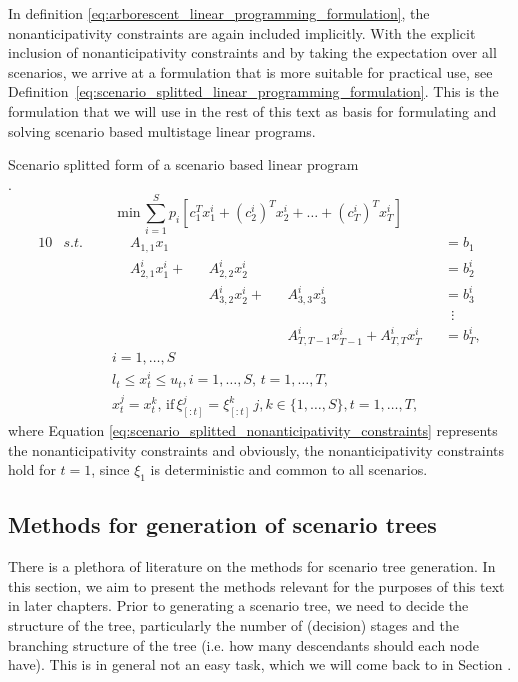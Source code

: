 In definition \ref{eq:arborescent_linear_programming_formulation}, the nonanticipativity constraints are again included implicitly. With the explicit inclusion of nonanticipativity constraints and by taking the expectation over all scenarios, we arrive at a formulation that is more suitable for practical use, see Definition~\ref{eq:scenario_splitted_linear_programming_formulation}. This is the formulation that we will use in the rest of this text as basis for formulating and solving scenario based multistage linear programs.
\begin{defn}
\label{eq:scenario_splitted_linear_programming_formulation}
{Scenario splitted form of a scenario based linear program \\ \cite{defourny_scenario_trees_scenario_splitted_formulation}}.
\footnotesize
\begin{equation*}
\mathrm{min} \, \sum_{i=1}^S p_i \left[ c_1^Tx_1^i + (c_2^i)^Tx_2^i + \dots + (c_T^i)^Tx_T^i  \right]
\end{equation*}
\vspace{-0.5cm}
\begin{alignat}{10}
& s.t. && \, && A_{1,1}x_1 && && \,&&=b_1 \nonumber \\
& && && A_{2,1}^ix_1^i  + &&A_{2,2}^ix_2^i && &&=b_2^i \nonumber \\
& && && && A_{3,2}^ix_{2}^i  + && A_{3,3}^ix_{3}^i &&=b_3^i \nonumber \\
& && && && && &&  \, \, \, \vdots \nonumber \\
& && && && && A_{T,T-1}^ix_{T-1}^i  +  A_{T,T}^ix_{T}^i &&=b_{T}^i, \nonumber
\end{alignat}
\vspace{-0.5cm}
\begin{align}
\label{eq:scenario_splitted_nonanticipativity_constraints}
& i=1,\dots,S \nonumber \\
& l_t \leq x_{t}^i \leq u_t, i=1,\dots,S, \, t=1,\dots,T,  \nonumber \\
& x_t^j=x_t^k, \, \mathrm{if} \, \xi_{[:t]}^j=\xi_{[:t]}^k \, j,k \in \{1,\dots,S\} , t=1,\dots,T,
\end{align}
\normalsize
where Equation \ref{eq:scenario_splitted_nonanticipativity_constraints} represents the nonanticipativity constraints and obviously, the nonanticipativity constraints hold for $t=1$, since $\xi_1$ is deterministic and common to all scenarios.
\end{defn}
\subsection{Methods for generation of scenario trees}
There is a plethora of literature on the methods for scenario tree generation. In this section, we aim to present the methods relevant for the purposes of this text in later chapters. Prior to generating a scenario tree, we need to decide the structure of the tree, particularly the number of (decision) stages and the branching structure of the tree (i.e. how many descendants should each node have). This is in general not an easy task, which we will come back to in Section .
